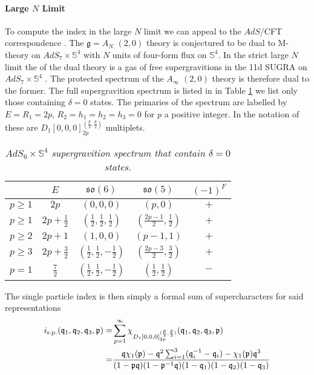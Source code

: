 \documentclass[main.tex]{subfiles}
\begin{document}
\paragraph{Large \texorpdfstring{$N$}{N} Limit}
To compute the index in the large $N$ limit we can appeal to the $AdS$/CFT correspondence \cite{Maldacena:1997re}.  The $\mathfrak{g}=A_{N}$ $(2,0)$ theory is conjectured to be dual to M-theory on $AdS_7\times\mathbb{S}^4$ with $N$ units of four-form flux on $\mathbb{S}^4$.  In the strict large $N$ limit the of the dual theory is a gas of free supergravitions in the 11d SUGRA on $AdS_7\times\mathbb{S}^4$ \cite{Witten:1996hc,Aharony:1999ti,Maldacena:1997re,Witten:1998wy}.  The protected spectrum of the $A_{\infty}$ $(2,0)$ theory is therefore dual to the former.  The full supergravition spectrum is listed in \cite{Bhattacharya:2008zy} in Table \ref{fig:supergravitionspec} we list only those containing $\delta=0$ states.  The primaries of the spectrum are labelled by $E=R_1=2p$, $R_2=h_1=h_2=h_3=0$ for $p$ a positive integer.  In the notation of \cite{Cordova:2016emh} these are $D_1[0,0,0]^{(\frac{p}{2},\frac{p}{2})}_{2p}$ multiplets.
\begin{table}
\centering
\begin{tabular}{|c||c|c|c|c|} 
\hline
  & $E$ & $\mathfrak{so}(6)$ & $\mathfrak{so}(5)$ & $(-1)^F$\\ 
  \hline\hline
$p\geq1$&$2p$&$(0,0,0)$&$(p,0)$&$+$\\\hline
$p\geq1$&$2p+\frac{1}{2}$&$(\frac{1}{2},\frac{1}{2},\frac{1}{2})$&$(\frac{2p-1}{2},\frac{1}{2})$&$+$\\\hline
$p\geq2$&$2p+1$&$(1,0,0)$&$(p-1,1)$&$+$\\\hline
$p\geq3$&$2p+\frac{3}{2}$&$(\frac{1}{2},\frac{1}{2},-\frac{1}{2})$&$(\frac{2p-3}{2},\frac{3}{2})$&$+$\\
 \hline
   $p=1$ & $\frac{7}{2}$ & $(\frac{1}{2},\frac{1}{2},-\frac{1}{2})$ & $(\frac{1}{2},\frac{1}{2})$ &$-$\\ 
 \hline
\end{tabular}
\caption{\textit{$AdS_6\times\mathbb{S}^4$ supergravition spectrum that contain $\delta=0$ states.}}
\label{fig:supergravitionspec}
\end{table}
The single particle index is then simply a formal sum of supercharacters for said representations
\begin{equation}
\begin{aligned}
i_{\text{s.p.}}(\mathfrak{q}_1,\mathfrak{q}_2,\mathfrak{q}_3,\mathfrak{p})=&\sum_{p=1}^{\infty}\chi_{D_1[0,0,0]^{(\frac{p}{2},\frac{p}{2})}_{2p}}(\mathfrak{q}_1,\mathfrak{q}_2,\mathfrak{q}_3,\mathfrak{p})\\
=&\frac{\mathfrak{q}\chi_1(\mathfrak{p})-\mathfrak{q}^2\sum_{i=1}^3(\mathfrak{q}^{-1}_i-\mathfrak{q}_i)-\chi_1(\mathfrak{p})\mathfrak{q}^{3}}{(1-\mathfrak{p}\mathfrak{q})(1-\mathfrak{p}^{-1}\mathfrak{q})(1-\mathfrak{q}_1)(1-\mathfrak{q}_2)(1-\mathfrak{q}_3)}
\end{aligned}
\end{equation}
\end{document}
